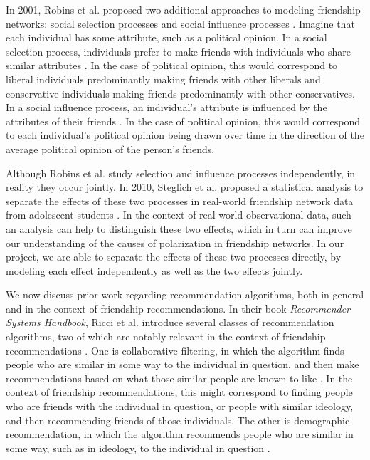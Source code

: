 \documentclass[12pt,letterpaper]{article}
\begin{document}
In 2001, Robins et al. proposed two additional approaches to modeling friendship networks: social selection processes \cite{robinsselection} and social influence processes \cite{robinsinfluence}. Imagine that each individual has some attribute, such as a political opinion. In a social selection process, individuals prefer to make friends with individuals who share similar attributes \cite{robinsselection}. In the case of political opinion, this would correspond to liberal individuals predominantly making friends with other liberals and conservative individuals making friends predominantly with other conservatives. In a social influence process, an individual's attribute is influenced by the attributes of their friends \cite{robinsinfluence}. In the case of political opinion, this would correspond to each individual's political opinion being drawn over time in the direction of the average political opinion of the person's friends.

Although Robins et al. study selection and influence processes independently, in reality they occur jointly. In 2010, Steglich et al. proposed a statistical analysis to separate the effects of these two processes in real-world friendship network data from adolescent students \cite{steglich}. In the context of real-world observational data, such an analysis can help to distinguish these two effects, which in turn can improve our understanding of the causes of polarization in friendship networks. In our project, we are able to separate the effects of these two processes directly, by modeling each effect independently as well as the two effects jointly.

We now discuss prior work regarding recommendation algorithms, both in general and in the context of friendship recommendations. In their book \textit{Recommender Systems Handbook}, Ricci et al. introduce several classes of recommendation algorithms, two of which are notably relevant in the context of friendship recommendations \cite{ricci}. One is collaborative filtering, in which the algorithm finds people who are similar in some way to the individual in question, and then make recommendations based on what those similar people are known to like \cite{ricci}. In the context of friendship recommendations, this might correspond to finding people who are friends with the individual in question, or people with similar ideology, and then recommending friends of those individuals. The other is demographic recommendation, in which the algorithm recommends people who are similar in some way, such as in ideology, to the individual in question \cite{ricci}.
\end{document}
